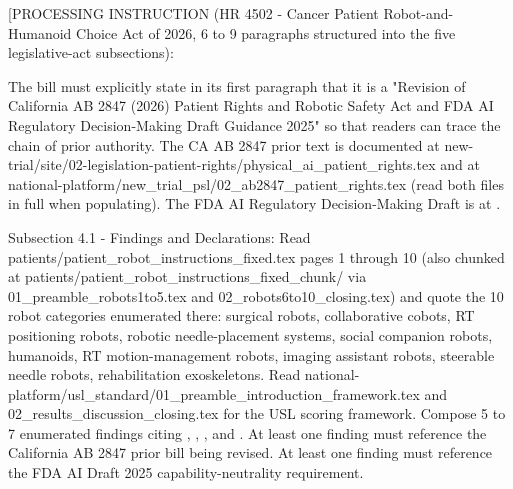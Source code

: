 
[PROCESSING INSTRUCTION (HR 4502 - Cancer Patient Robot-and-Humanoid
Choice Act of 2026, 6 to 9 paragraphs structured into the five
legislative-act subsections):

The bill must explicitly state in its first paragraph that it is a
"Revision of California AB 2847 (2026) Patient Rights and Robotic
Safety Act and FDA AI Regulatory Decision-Making Draft Guidance 2025"
so that readers can trace the chain of prior authority. The CA AB 2847
prior text is documented at
new-trial/site/02-legislation-patient-rights/physical\_ai\_patient\_rights.tex
and at national-platform/new\_trial\_psl/02\_ab2847\_patient\_rights.tex
(read both files in full when populating). The FDA AI Regulatory
Decision-Making Draft is at \cite{fda_ai_regulatory_decision_draft_2025}.

Subsection 4.1 - Findings and Declarations: Read
patients/patient\_robot\_instructions\_fixed.tex pages 1 through 10
(also chunked at
patients/patient\_robot\_instructions\_fixed\_chunk/ via
01\_preamble\_robots1to5.tex and 02\_robots6to10\_closing.tex) and
quote the 10 robot categories enumerated there: surgical robots,
collaborative cobots, RT positioning robots, robotic needle-placement
systems, social companion robots, humanoids, RT motion-management
robots, imaging assistant robots, steerable needle robots,
rehabilitation exoskeletons. Read
national-platform/usl\_standard/01\_preamble\_introduction\_framework.tex
and 02\_results\_discussion\_closing.tex for the USL scoring framework.
Compose 5 to 7 enumerated findings citing
\cite{kawchak_2026_18810541}, \cite{kawchak_2026_18778219},
\cite{target2025robotic_bronchoscopy}, and
\cite{vorontsov2024virchow}. At least one finding must reference the
California AB 2847 prior bill being revised. At least one finding must
reference the FDA AI Draft 2025 capability-neutrality requirement.

